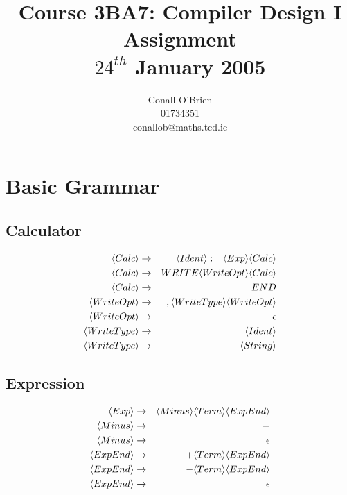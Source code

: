 \documentclass[a4paper,12pt]{article}
\newcommand{\nonterminal}[1]{\langle #1 \rangle}
\begin{document}
\title{Course 3BA7: Compiler Design I \\ Assignment \\	$24^{th}$ January 2005}

\author{Conall O'Brien \\ 01734351 \\ conallob@maths.tcd.ie}

\maketitle

\section{Basic Grammar}

\subsection*{Calculator}

\begin{eqnarray}
\setcounter{equation}{1}
\nonterminal{Calc} 		&	\to	&	 \nonterminal{Ident} := \nonterminal{Exp} \nonterminal{Calc}	\\
\nonterminal{Calc} 		&	\to	&	 WRITE \nonterminal{WriteOpt} \nonterminal{Calc}	\\
\nonterminal{Calc} 		&	\to	&	 END	\\
\nonterminal{WriteOpt} 	& 	\to	&	 , \nonterminal{WriteType} \nonterminal{WriteOpt}	\\
\nonterminal{WriteOpt} 	& 	\to	&	 \epsilon	\\
\nonterminal{WriteType} & 	\to	&	 \nonterminal{Ident}		\\
\nonterminal{WriteType} & 	\to	&	 \nonterminal{String}
\end{eqnarray}

\subsection*{Expression}
                            
\begin{eqnarray}
\setcounter{equation}{1}
\nonterminal{Exp} 		&	\to	&	 \nonterminal{Minus} \nonterminal{Term} \nonterminal{ExpEnd}	\\
\nonterminal{Minus} 		&	\to	&	 -	\\
\nonterminal{Minus} 		&	\to	&	 \epsilon	\\
\nonterminal{ExpEnd} 	&	\to	&	 + \nonterminal{Term} \nonterminal{ExpEnd}	\\
\nonterminal{ExpEnd} 	&	\to	&	 - \nonterminal{Term} \nonterminal{ExpEnd}	\\
\nonterminal{ExpEnd} 	&	\to	&	 \epsilon	
\end{eqnarray}
\end{document}
